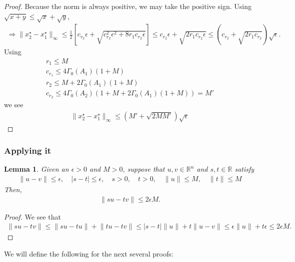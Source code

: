 \documentclass{article}
\newtheorem{lemma}[theorem]{Lemma}
\theoremstyle{case}
\newcommand{\Rn}{\mathbb R^n}
\newcommand{\reals}{\mathbb R}
\newcommand{\huff}{{\Gamma_0}}
\begin{document}
\begin{proof}
Because the norm is always positive, we may take the positive sign.
Using $\sqrt{x + y} \le \sqrt{x} + \sqrt{y}$,
\begin{align*}
\Longrightarrow \|x_2^{\star} - x_1^{\star}\|_{\infty} \le \frac 1 2 \left[c_{r_2}\epsilon + \sqrt{c_{r_2}^2\epsilon^2 + 8r_1c_{r_2}\epsilon}\right] 
\le c_{r_2}\epsilon + \sqrt{2r_1c_{r_2}\epsilon}
\le \left(c_{r_2} + \sqrt{2r_1c_{r_2}}\right)\sqrt{\epsilon}.
\end{align*}
Using 
\begin{align*}
r_1 \le M \\
c_{r_1} \le 4\huff(A_1)\left(1 + M\right) \\
r_2 \le  M + 2\huff(A_1)\left(1 + M\right) \\
c_{r_2} \le  4\huff(A_2)\left(1 + M + 2\huff(A_1)\left(1 + M\right)\right) = M'
\end{align*}
we see
\begin{align*}
\|x_2^{\star} - x_1^{\star}\|_{\infty} \le \left( M' + \sqrt{2MM'}\right)\sqrt{\epsilon}
\end{align*}

\end{proof}


\subsubsection{Applying it}

\begin{lemma}
\label{the_simple_bound_one}
Given an $\epsilon > 0$ and $M > 0$, suppose that $u,v \in \Rn$ and $s,t \in \reals$ satisfy
\begin{align}
\|u - v \| \le \epsilon, \quad
|s - t | \le \epsilon, \quad
s > 0, \quad
t > 0, \quad
\|u\| \le M, \quad
\|t\| \le M
\end{align}
Then,
\begin{align}
\bigg\|su - tv\bigg\| \le 2\epsilon M.
\end{align}
\end{lemma}


\begin{proof}
We see that
\begin{align}
\bigg\|su - tv\bigg\| \le \bigg\|su - tu\bigg\| + \bigg\|tu- tv\bigg\| \le |s - t| \|u\| + t \|u - v\| \le \epsilon \|u\| + t \epsilon \le 2 \epsilon M.
\end{align}
\end{proof}

We will define the following for the next several proofs:
\end{document}
